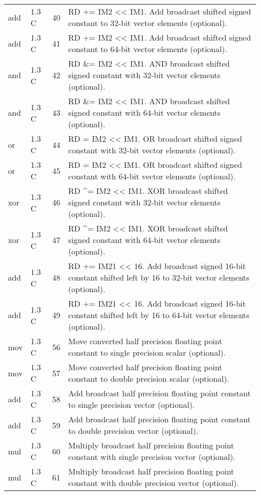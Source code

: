 \documentclass[forwardcom.tex]{subfiles}
\begin{document}
\begin{longtable} {|p{20mm}|p{10mm}|p{8mm}|p{75mm}|}
add           & 1.3 C & 40 & RD += IM2 \textless\textless{} IM1. Add broadcast shifted signed constant to 32-bit vector elements (optional). \\
add           & 1.3 C & 41 & RD += IM2 \textless\textless{} IM1. Add broadcast shifted signed constant to 64-bit vector elements (optional). \\
and           & 1.3 C & 42 & RD \&= IM2 \textless\textless{} IM1. AND broadcast shifted signed constant with 32-bit vector elements (optional). \\
and           & 1.3 C & 43 & RD \&= IM2 \textless\textless{} IM1. AND broadcast shifted signed constant with 64-bit vector elements (optional). \\
or            & 1.3 C & 44 & RD \textbar{}= IM2 \textless\textless{} IM1. OR broadcast shifted signed constant with 32-bit vector elements (optional). \\
or            & 1.3 C & 45 & RD \textbar{}= IM2 \textless\textless{} IM1. OR broadcast shifted signed constant with 64-bit vector elements (optional). \\
xor           & 1.3 C & 46 & RD \^{}= IM2 \textless\textless{} IM1. XOR broadcast shifted signed constant with 32-bit vector elements (optional). \\
xor           & 1.3 C & 47 & RD \^{}= IM2 \textless\textless{} IM1. XOR broadcast shifted signed constant with 64-bit vector elements (optional). \\
add           & 1.3 C & 48 & RD += IM21 \textless\textless{} 16. Add broadcast signed 16-bit constant shifted left by 16 to 32-bit vector elements (optional). \\
add           & 1.3 C & 49 & RD += IM21 \textless\textless{} 16. Add broadcast signed 16-bit constant shifted left by 16 to 64-bit vector elements (optional). \\
mov           & 1.3 C & 56 & Move converted half precision floating point constant to single
precision scalar (optional). \\
mov           & 1.3 C & 57 & Move converted half precision floating point constant to double
precision scalar (optional). \\
add           & 1.3 C & 58 & Add broadcast half precision floating point constant to single
precision vector (optional). \\
add           & 1.3 C & 59 & Add broadcast half precision floating point constant to double
precision vector (optional). \\
mul           & 1.3 C & 60 & Multiply broadcast half precision floating point constant with single precision vector (optional). \\
mul           & 1.3 C & 61 & Multiply broadcast half precision floating point constant with double precision vector (optional). \\


\end{longtable}
\end{document}
